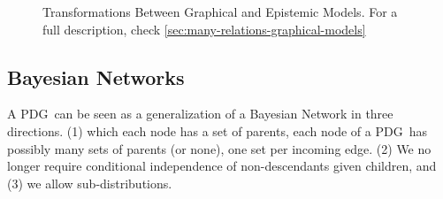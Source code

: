 \documentclass{article}
\newcommand{\MN}{PDG}
\begin{document}
\begin{figure}[t]
		\caption{Transformations Between Graphical and Epistemic Models. For a full description, check \cref{sec:many-relations-graphical-models} }
		\label{fig:model-transformations}
	\end{figure}

	
	
	
	
	\subsection{Bayesian Networks} \label{sec:bn-convert}
		
	A \MN\ can be seen as a generalization of a Bayesian Network in three directions. (1) which each node has a set of parents, each node of a \MN\ has possibly many sets of parents (or none), one set per incoming edge. (2) We no longer require conditional independence of non-descendants given children, and (3) we allow sub-distributions.
	
\end{document}
